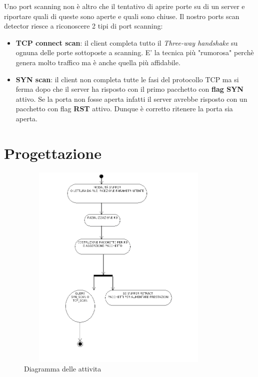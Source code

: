 \documentclass[a4paper,12pt]{article} %
\begin{document}
\newpage

Uno port scanning non è altro che il tentativo di aprire porte su di un server e riportare quali di queste sono aperte e quali sono
chiuse. Il nostro ports scan detector riesce a riconoscere 2 tipi di port scanning:

\begin{itemize}

\item \textbf{TCP connect scan}: il client completa tutto il \emph{Three-way handshake} su 
ognuna delle porte sottoposte a scanning. E' la tecnica più "rumorosa" perch\`e genera molto traffico ma è anche quella più
affidabile.

\item \textbf{SYN scan}: il client non completa tutte le fasi del protocollo TCP ma si ferma dopo che il server ha risposto con 
il primo pacchetto con \textbf{flag SYN} attivo. Se la porta non fosse aperta infatti il server avrebbe risposto con un pacchetto con 
flag \textbf{RST} attivo. Dunque è corretto ritenere la porta sia aperta.

\end{itemize}




\section{Progettazione}


\begin{figure}[htbp]
\centering
\includegraphics[width=10cm,height=10cm]{attivita.png}
\caption{\label{Diagramma delle attivita} Diagramma delle attivita}
\end{figure}
\end{document}
